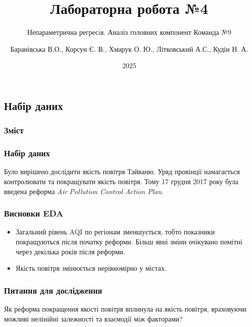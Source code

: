 ﻿\documentclass{beamer}
\title{Лабораторна робота №4}
\subtitle{Непараметрична регресiя. Аналіз головних компонент }
\subtitle{Команда №9}
\author[]{
  Баранівська В.О.,
  Корсун Є. В.,
  Хмарук О. Ю.,
  Літковський А.С.,
  Кудін Н. А.
}
\date{2025}
\begin{document}
\frame{\titlepage}

\graphicspath{{../../../}} %


\begin{frame}
  \section{Набір даних}

  \frametitle{Зміст}
  \tableofcontents[currentsection]
\end{frame}

\begin{frame}
  \frametitle{Набір даних}

  Було вирішено дослідити якість повітря Тайваню. Уряд провінції намагається
  контролювати та покращувати якість повітря. Тому 17 грудня 2017 року була введена
  реформа \textit{Air Pollution Control Action Plan}.

  \begin{center}

  \end{center}
\end{frame}

\begin{frame}
  \frametitle{Висновки EDA}
  \begin{itemize}
    \item Загальний рівень AQI по регіонам зменшується, тобто показники покращуються після початку реформи.
    Більш явні зміни очікувано помітні через декілька років після реформи.
    \item Якість повітря змінюється нерівномірно у містах.
  \end{itemize}
\end{frame}

\begin{frame}
  \frametitle{Питання для дослідження}
  Як реформа покращення якості повітря вплинула на якість повітря,
  враховуючи можливі нелінійні залежності та взаємодії між факторами?
\end{frame}
\end{document}
